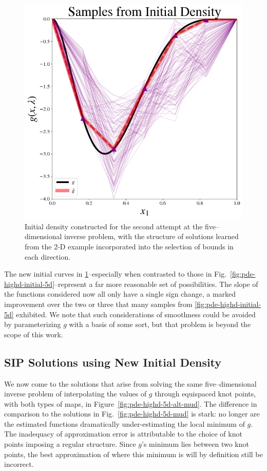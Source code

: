 \begin{figure}
\centering
  \includegraphics[width=0.675\linewidth]{figures/pde-highd/pde-highd_init_D5-alt}
\caption{
Initial density constructed for the second attempt at the five--dimensional inverse problem, with the structure of solutions learned from the 2-D example incorporated into the selection of bounds in each direction.
}
\label{fig:pde-highd-alt-initial-5d}
\end{figure}

The new initial curves in \ref{fig:pde-highd-alt-initial-5d}\---especially when contrasted to those in Fig.~\ref{fig:pde-highd-initial-5d}\---represent a far more reasonable set of possibilities.
The slope of the functions considered now all only have a single sign change, a marked improvement over the two or three that many samples from \ref{fig:pde-highd-initial-5d} exhibited.
We note that such considerations of smoothness could be avoided by parameterizing $g$ with a basis of some sort, but that problem is beyond the scope of this work.

\subsection{SIP Solutions using New Initial Density}
We now come to the solutions that arise from solving the same five--dimensional inverse problem of interpolating the values of $g$ through equispaced knot points, with both types of maps, in Figure~\ref{fig:pde-highd-5d-alt-mud}.
The difference in comparison to the solutions in Fig.~\ref{fig:pde-highd-5d-mud} is stark: no longer are the estimated functions dramatically under-estimating the local minimum of $g$.
The inadequacy of approximation error is attributable to the choice of knot points imposing a regular structure.
Since $g$'s minimum lies between two knot points, the best approximation of where this minimum is will by definition still be incorrect.

